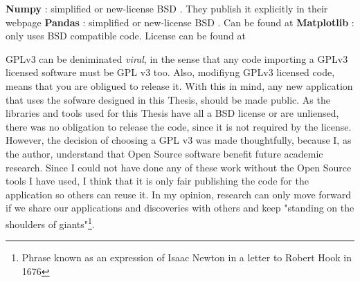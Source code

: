 \textbf{Numpy} \cite{numpy}: simplified or new-license BSD \cite{bsd}. They publish it explicitly in their webpage \cite{numpy_l}
\textbf{Pandas} \cite{pandas}: simplified or new-license BSD \cite{bsd}. Can be found at \cite{pandas_l}
\textbf{Matplotlib} \cite{matplotlib}:  only uses BSD compatible code. License can be found at \cite{matplotlib_l}

GPLv3 can be deniminated \emph{viral}, in the sense that any code importing a GPLv3 licensed software must be GPL v3 too. Also, modifiyng GPLv3 licensed code, means that you are obligued to release it. With this in mind, any new application that uses the sofware designed in this Thesis, should be made public. As the libraries and tools used for this Thesis have all a BSD license or are unliensed, there was no obligation to release the code, since it is not required by the license. However, the decision of choosing a GPL v3 was made thoughtfully, because I, as the author, understand that Open Source software benefit future academic research. Since I could not have done any of these work without the Open Source tools I have used, I think that it is only fair publishing the code for the application so others can reuse it. In my opinion, research can only move forward if we share our applications and discoveries with others and keep "standing on the shoulders of giants"\footnote{Phrase known as an expression of Isaac Newton in a letter to Robert Hook in 1676}.

\begin{flushright}

\end{flushright}